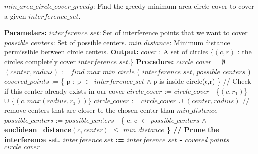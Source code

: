\begin{algorithm}[!htb]
\caption{\textbf{$min\_area\_circle\_cover\_greedy$}: Find the greedy minimum area circle cover to cover a given $interference\_set$.}
\begin{algorithmic}
\State \textbf{Parameters:}
\State \tab $interference\_set$: Set of interference points that we want to cover
\State \tab $possible\_centers$: Set of possible centers.  
\State \tab $min\_distance$: Minimum distance permissible between circle centers. 
\State \textbf{Output:}
\State \tab $cover$ : A set of circles \{$(c,r)$ :  the circles completely 
\State \tab \tab cover $interference\_set$.\}
\State \textbf{Procedure:}
\State
\State $circle\_cover$ = $\emptyset$
\State $(center,radius)$ := $find\_max\_min\_circle$ ( $interference\_set$, 
\State \tab \tab \tab $possible\_centers$ )
\State $covered\_points$ := \{ p : p $\in$ $interference\_set$ $\wedge$ p is inside circle(c,r) \}
\State // Check if this center already exists in our cover
\State  	$circle\_cover$ := $circle\_cover$ - \{$(c,r_1)$\} $\cup$ \{$(c,max(radius,r_1))$\}
\Else 
\State 	$circle\_cover$ := $circle\_cover$ $\cup$ $(center,radius)$
\EndIf
\State // remove centers that are closer to the chosen center than $min\_distance$
\State $possible\_centers$ := $possible\_centers$ - \{ c: c $\in$ $possible\_centers$ 
\State \tab \tab \tab $\wedge$ \bf{euclidean\_distance}$(c,center)$ $\le$ $min\_distance$ 
\State \tab \tab \tab \}
\State // Prune the interference set.
\State $interference\_set$ := $interference\_set$ - $covered\_points$
\EndWhile
\State \Return $circle\_cover$
\end{algorithmic}
\end{algorithm}


